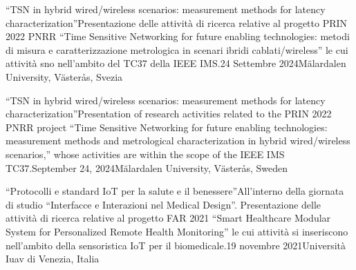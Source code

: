


{``TSN in hybrid wired/wireless scenarios: measurement methods for latency characterization''}{Presentazione delle attività di ricerca relative al progetto PRIN 2022 PNRR ``Time Sensitive Networking for future enabling technologies:
metodi di misura e caratterizzazione metrologica in scenari ibridi
    cablati/wireless'' le cui attività sno nell'ambito del TC37 della IEEE IMS.}{24 Settembre 2024}{Mälardalen University, Västerås, Svezia}

{``TSN in hybrid wired/wireless scenarios: measurement methods for latency characterization''}{Presentation of research activities related to the PRIN 2022 PNRR project ``Time Sensitive Networking for future enabling technologies: measurement methods and metrological characterization in hybrid wired/wireless scenarios,'' whose activities are within the scope of the IEEE IMS TC37.}{September 24, 2024}{Mälardalen University, Västerås, Sweden}

{``Protocolli e standard IoT per la salute e il benessere''}{All'interno della giornata di studio ``Interfacce e Interazioni nel Medical Design''. Presentazione delle attività di ricerca relative al progetto FAR 2021 ``Smart Healthcare Modular System for Personalized Remote Health Monitoring'' le cui attività si inseriscono nell'ambito della sensoristica IoT per il biomedicale.}{19 novembre 2021}{Università Iuav di Venezia, Italia}

